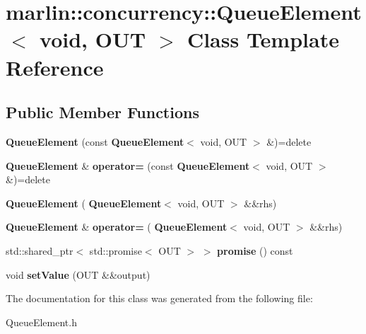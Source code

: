 \section{marlin\+:\+:concurrency\+:\+:Queue\+Element$<$ void, O\+UT $>$ Class Template Reference}
\label{classmarlin_1_1concurrency_1_1QueueElement_3_01void_00_01OUT_01_4}
\subsection*{Public Member Functions}
\begin{DoxyCompactItemize}
\item 
\mbox{\label{classmarlin_1_1concurrency_1_1QueueElement_3_01void_00_01OUT_01_4_a52c04239dfdacc7c509c64d48eb2773c}} 
{\bfseries Queue\+Element} (const \textbf{ Queue\+Element}$<$ void, O\+UT $>$ \&)=delete
\item 
\mbox{\label{classmarlin_1_1concurrency_1_1QueueElement_3_01void_00_01OUT_01_4_a71fce0a691591530079c2e5e1f42753c}} 
\textbf{ Queue\+Element} \& {\bfseries operator=} (const \textbf{ Queue\+Element}$<$ void, O\+UT $>$ \&)=delete
\item 
\mbox{\label{classmarlin_1_1concurrency_1_1QueueElement_3_01void_00_01OUT_01_4_ac535c4942de170b11a4602b2d2b9309b}} 
{\bfseries Queue\+Element} (\textbf{ Queue\+Element}$<$ void, O\+UT $>$ \&\&rhs)
\item 
\mbox{\label{classmarlin_1_1concurrency_1_1QueueElement_3_01void_00_01OUT_01_4_a2ec881dc373eeac9a4ccde492e22f69b}} 
\textbf{ Queue\+Element} \& {\bfseries operator=} (\textbf{ Queue\+Element}$<$ void, O\+UT $>$ \&\&rhs)
\item 
\mbox{\label{classmarlin_1_1concurrency_1_1QueueElement_3_01void_00_01OUT_01_4_a4c5c741751dc184988651524fc704849}} 
std\+::shared\+\_\+ptr$<$ std\+::promise$<$ O\+UT $>$ $>$ {\bfseries promise} () const
\item 
\mbox{\label{classmarlin_1_1concurrency_1_1QueueElement_3_01void_00_01OUT_01_4_afe0bed3f8e980b9124a81e9edafbd6f0}} 
void {\bfseries set\+Value} (O\+UT \&\&output)
\end{DoxyCompactItemize}


The documentation for this class was generated from the following file\+:\begin{DoxyCompactItemize}
\item 
Queue\+Element.\+h\end{DoxyCompactItemize}
